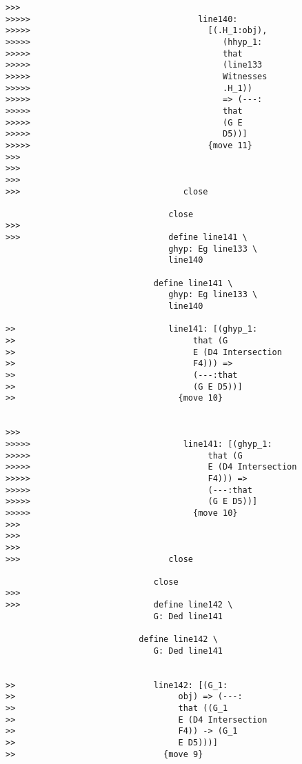 \documentclass[12pt]{article}
\begin{document}
\begin{verbatim}
>>>
>>>>>                                  line140:
>>>>>                                    [(.H_1:obj),
>>>>>                                       (hhyp_1:
>>>>>                                       that
>>>>>                                       (line133
>>>>>                                       Witnesses
>>>>>                                       .H_1))
>>>>>                                       => (---:
>>>>>                                       that
>>>>>                                       (G E
>>>>>                                       D5))]
>>>>>                                    {move 11}
>>>
>>>
>>>
>>>                                 close

                                 close
>>>
>>>                              define line141 \
                                 ghyp: Eg line133 \
                                 line140

                              define line141 \
                                 ghyp: Eg line133 \
                                 line140

>>                               line141: [(ghyp_1:
>>                                    that (G
>>                                    E (D4 Intersection
>>                                    F4))) =>
>>                                    (---:that
>>                                    (G E D5))]
>>                                 {move 10}


>>>
>>>>>                               line141: [(ghyp_1:
>>>>>                                    that (G
>>>>>                                    E (D4 Intersection
>>>>>                                    F4))) =>
>>>>>                                    (---:that
>>>>>                                    (G E D5))]
>>>>>                                 {move 10}
>>>
>>>
>>>
>>>                              close

                              close
>>>
>>>                           define line142 \
                              G: Ded line141

                           define line142 \
                              G: Ded line141


>>                            line142: [(G_1:
>>                                 obj) => (---:
>>                                 that ((G_1
>>                                 E (D4 Intersection
>>                                 F4)) -> (G_1
>>                                 E D5)))]
>>                              {move 9}



\end{verbatim}
\end{document}
